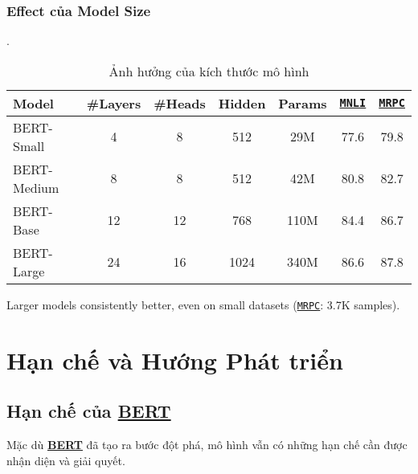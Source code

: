 \subsubsection{Effect của Model Size}
\begin{table}[H]
    \centering
    \caption{Ảnh hưởng của kích thước mô hình \cite{devlin2018bert}}.
    \label{tab:model_size_effect}
    \begin{tabular}{lcccccc}
        \toprule
        \textbf{Model} & \textbf{\#Layers} & \textbf{\#Heads} & \textbf{Hidden} & \textbf{Params} & \textbf{\hyperref[acro:mnli]{\texttt{MNLI}}} & \textbf{\hyperref[acro:mrpc]{\texttt{MRPC}}} \\
        \midrule
        BERT-Small & 4 & 8 & 512 & 29M & 77.6 & 79.8 \\
        BERT-Medium & 8 & 8 & 512 & 42M & 80.8 & 82.7 \\
        BERT-Base & 12 & 12 & 768 & 110M & 84.4 & 86.7 \\
        BERT-Large & 24 & 16 & 1024 & 340M & 86.6 & 87.8 \\
        \bottomrule
    \end{tabular}
\end{table}

Larger models consistently better, even on small datasets (\hyperref[acro:mrpc]{\texttt{MRPC}}: 3.7K samples).
\section{Hạn chế và Hướng Phát triển}
\label{sec:han_che_huong_phat_trien}

\subsection{Hạn chế của \hyperref[acro:bert]{\textbf{BERT}}}
\label{ssec:han_che_bert}
Mặc dù \hyperref[acro:bert]{\textbf{BERT}} đã tạo ra bước đột phá, mô hình vẫn có những hạn chế cần được nhận diện và giải quyết.
